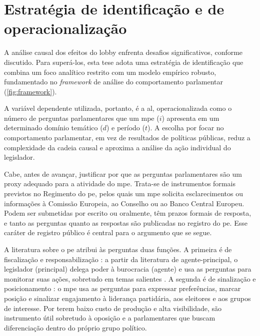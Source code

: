 \section{Estratégia de identificação e de operacionalização}
\label{section:identificacao}

A análise causal dos efeitos do lobby enfrenta desafios significativos, conforme discutido. Para superá-los, esta tese adota uma estratégia de identificação que combina um foco analítico restrito com um modelo empírico robusto, fundamentado no \textit{framework} de análise do comportamento parlamentar (\ref{fig:framework}).

A variável dependente utilizada, portanto, é a \acrfull{al}, operacionalizada como o número de perguntas parlamentares que um \acrshort{mpe} ($i$) apresenta em um determinado domínio temático ($d$) e período ($t$). A escolha por focar no comportamento parlamentar, em vez de resultados de políticas públicas, reduz a complexidade da cadeia causal e aproxima a análise da ação individual do legislador.

Cabe, antes de avançar, justificar por que as perguntas parlamentares são um proxy adequado para a atividade do \acrshort{mpe}. Trata-se de instrumentos formais previstos no Regimento do \acrshort{pe}, pelos quais um \acrshort{mpe} solicita esclarecimentos ou informações à Comissão Europeia, ao Conselho ou ao Banco Central Europeu. Podem ser submetidas por escrito ou oralmente, têm prazos formais de resposta, e tanto as perguntas quanto as respostas são publicadas no registro do \acrshort{pe}. Esse caráter de registro público é central para o argumento que se segue.

A literatura sobre o \acrshort{pe} atribui às perguntas duas funções. A primeira é de fiscalização e responsabilização \cite{jensen2013parliamentary, maricut2020qa, martin2013parliamentary}: a partir da literatura de agente-principal, o legislador (principal) delega poder à burocracia (agente) e usa as perguntas para monitorar suas ações, sobretudo em temas salientes \cite{mccubbin1984congressional, saalfeld2000members, strom2000delegation, koop2011explaining}. A segunda é de sinalização e posicionamento \cite{otjes2017parliamentary, proksch2010parliamentary, bevan2023do, navarro2022banking}: o \acrshort{mpe} usa as perguntas para expressar preferências, marcar posição e sinalizar engajamento à liderança partidária, aos eleitores e aos grupos de interesse. Por terem baixo custo de produção e alta visibilidade, são instrumento útil sobretudo à oposição e a parlamentares que buscam diferenciação dentro do próprio grupo político.

